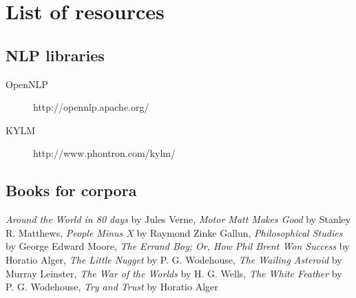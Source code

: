 \section{List of resources}
\subsection*{NLP libraries}
\label{sec:resources}
\begin{description}
\item[OpenNLP]{http://opennlp.apache.org/}
\item[KYLM]{http://www.phontron.com/kylm/}
\end{description}
\subsection*{Books for corpora} 
\emph{Around the World in 80 days} by Jules Verne, \emph{Motor Matt Makes Good} by Stanley R. Matthews, \emph{People Minus X} by Raymond Zinke Gallun, \emph{Philosophical Studies} by George Edward Moore, \emph{The Errand Boy; Or, How Phil Brent Won Success} by Horatio Alger, \emph{The Little Nugget} by P. G. Wodehouse, \emph{The Wailing Asteroid} by Murray Leinster, \emph{The War of the Worlds} by H. G. Wells, \emph{The White Feather} by P. G. Wodehouse, \emph{Try and Trust} by Horatio Alger